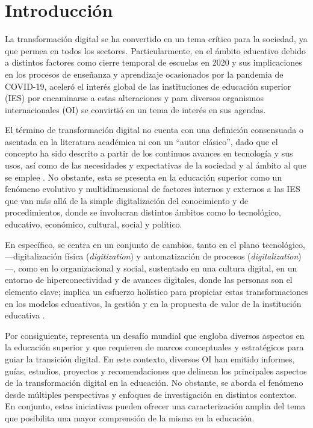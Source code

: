 \section{Introducción}\label{sec-intro}

La transformación digital se ha convertido en un tema crítico para la
sociedad, ya que permea en todos los sectores. Particularmente, en el
ámbito educativo debido a distintos factores como cierre temporal de
escuelas en 2020 y sus implicaciones en los procesos de enseñanza y
aprendizaje ocasionados por la pandemia de COVID-19, aceleró el interés
global de las instituciones de educación superior (IES) por encaminarse
a estas alteraciones \cite{gomez2021,PonceLopez2021EstadoTIC} y para diversos
organismos internacionales (OI) se convirtió en un tema de interés en
sus agendas.

El término de transformación digital no cuenta con una definición
consensuada o asentada en la literatura académica ni con un ``autor
clásico'', dado que el concepto ha sido descrito a partir de los
continuos avances en tecnología y sus usos, así como de las necesidades
y expectativas de la sociedad y al ámbito al que se emplee \cite{fernandez-martínzez2019,schallmo2017}. No
obstante, esta se presenta en la educación superior como un fenómeno
evolutivo y multidimensional de factores internos y externos a las IES
que van más allá de la simple digitalización del conocimiento y de
procedimientos, donde se involucran distintos ámbitos como lo
tecnológico, educativo, económico, cultural, social y político.

En específico, se centra en un conjunto de cambios, tanto en el plano
tecnológico, ---digitalización física (\emph{digitization}) y
automatización de procesos (\emph{digitalization})---, como en lo
organizacional y social, sustentado en una cultura digital, en un
entorno de hiperconectividad y de avances digitales, donde las personas
son el elemento clave; implica un esfuerzo holístico para propiciar
estas transformaciones en los modelos educativos, la gestión y en la
propuesta de valor de la institución educativa \cite{bikse2021,delgado-fernández2020,grajek2020,llorens2021udigital,mergel2019,yavuz2023}.

Por consiguiente, representa un desafío mundial que engloba diversos
aspectos en la educación superior y que requieren de marcos conceptuales
y estratégicos para guiar la transición digital. En este contexto,
diversos OI han emitido informes, guías, estudios, proyectos y
recomendaciones que delinean los principales aspectos de la
transformación digital en la educación. No obstante, se aborda el
fenómeno desde múltiples perspectivas y enfoques de investigación en
distintos contextos. En conjunto, estas iniciativas pueden ofrecer una
caracterización amplia del tema que posibilita una mayor comprensión de
la misma en la educación.

